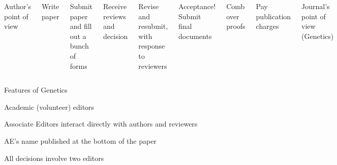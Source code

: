 \documentclass[aspectratio=169,12pt,t]{beamer}
\begin{document}
\begin{frame}{}

  \begin{columns}

    \color{title} Author's point of view

{\footnotesize

  \bi
\item Write paper
\item Submit paper and fill out a bunch of forms
\item Receive reviews and decision
\item Revise and resubmit, with response to reviewers
\item Acceptance! Submit final documents
\item Comb over proofs
\item Pay publication charges
  \ei
}


    \color{title} Journal's point of view ({\lolit Genetics})


  \end{columns}

\end{frame}





\begin{frame}{Features of Genetics}

  \bbi
\item Academic (volunteer) editors
\item Associate Editors interact directly with authors and reviewers
\item AE's name published at the bottom of the paper
\item All decisions involve two editors
  \ei


\end{frame}
\end{document}
